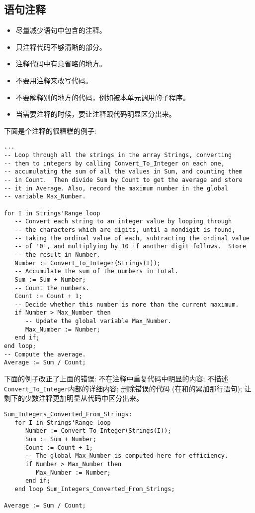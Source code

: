 \subsection{语句注释}
\begin{itemize}
    \item 尽量减少语句中包含的注释。
    \item 只注释代码不够清晰的部分。
    \item 注释代码中有意省略的地方。
    \item 不要用注释来改写代码。
    \item 不要解释别的地方的代码，例如被本单元调用的子程序。
    \item 当需要注释的时候，要让注释跟代码明显区分出来。
\end{itemize}

\begin{blockindent}
下面是个注释的很糟糕的例子:
\begin{lstlisting}
...
-- Loop through all the strings in the array Strings, converting
-- them to integers by calling Convert_To_Integer on each one,
-- accumulating the sum of all the values in Sum, and counting them
-- in Count.  Then divide Sum by Count to get the average and store
-- it in Average. Also, record the maximum number in the global
-- variable Max_Number.

for I in Strings'Range loop
   -- Convert each string to an integer value by looping through
   -- the characters which are digits, until a nondigit is found,
   -- taking the ordinal value of each, subtracting the ordinal value
   -- of '0', and multiplying by 10 if another digit follows.  Store
   -- the result in Number.
   Number := Convert_To_Integer(Strings(I));
   -- Accumulate the sum of the numbers in Total.
   Sum := Sum + Number;
   -- Count the numbers.
   Count := Count + 1;
   -- Decide whether this number is more than the current maximum.
   if Number > Max_Number then
      -- Update the global variable Max_Number.
      Max_Number := Number;
   end if;
end loop;
-- Compute the average.
Average := Sum / Count;
\end{lstlisting}

下面的例子改正了上面的错误: 不在注释中重复代码中明显的内容;
不描述\texttt{Convert\_To\_Integer}内部的详细内容; 删除错误的代码
(在和的累加那行语句); 让剩下的少数注释更加明显从代码中区分出来。
\begin{lstlisting}
Sum_Integers_Converted_From_Strings:
   for I in Strings'Range loop
      Number := Convert_To_Integer(Strings(I));
      Sum := Sum + Number;
      Count := Count + 1;
      -- The global Max_Number is computed here for efficiency.
      if Number > Max_Number then
         Max_Number := Number;
      end if;
   end loop Sum_Integers_Converted_From_Strings;

Average := Sum / Count;
\end{lstlisting}
\end{blockindent}

